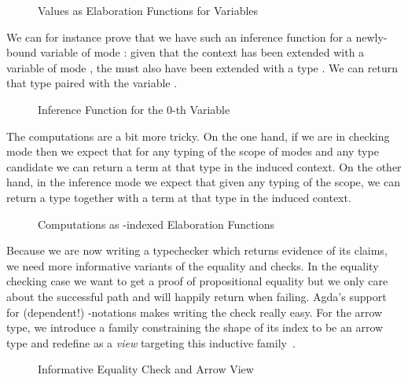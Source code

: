\begin{figure}[h!]
\caption{Values as Elaboration Functions for Variables\label{fig:elabvalues}}
\end{figure}

We can for instance prove that we have such an inference function for a newly-bound
variable of mode : given that the context has been extended with a variable
of mode , the  must also have been extended with a type .
We can return that type paired with the variable .

\begin{figure}[h]
\caption{Inference Function for the 0-th Variable\label{fig:elabvar0}}
\end{figure}

The computations are a bit more tricky. On the one hand, if we are in checking mode
then we expect that for any typing of the scope of modes and any type candidate we
can  return a term at that type in the induced context. On the other hand,
in the inference mode we expect that given any typing of the scope, we can 
return a type together with a term at that type in the induced context.

\begin{figure}[h]
\caption{Computations as -indexed Elaboration Functions\label{fig:elabcomputations}}
\end{figure}

Because we are now writing a typechecker which returns evidence of its claims, we need
more informative variants of the equality and  checks. In the equality
checking case we want to get a proof of propositional equality but we only care
about the successful path and will happily return  when failing.
Agda's support for (dependent!) -notations makes writing the check
really easy. For the arrow type, we introduce a family  constraining the
shape of its index to be an arrow type and redefine  as a \emph{view} targeting
this inductive family~\cite{DBLP:conf/popl/Wadler87,DBLP:journals/jfp/McBrideM04}.

\begin{figure}[h]
\begin{minipage}{0.45\textwidth}
\end{minipage}
\begin{minipage}{0.45\textwidth}
\end{minipage}
\caption{Informative Equality Check and Arrow View\label{fig:informativecheck}}
\end{figure}

